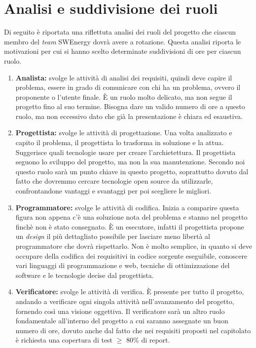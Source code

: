 \section{Analisi e suddivisione dei ruoli}

Di seguito è riportata una riflettuta analisi dei ruoli del progetto che ciascun
membro del \textit{team} SWEnergy dovrà avere a rotazione.
Questa analisi riporta le motivazioni per cui si hanno scelto determinate suddivisioni 
di ore per ciascun ruolo.
\begin{enumerate}

\item \textbf{Analista:} svolge le attività di analisi dei requisiti, quindi deve capire
il problema, essere in grado di comunicare con chi ha un problema, ovvero il proponente 
o l'utente finale. È un ruolo molto delicato, ma non segue il progetto fino al suo termine.
Bisogna dare un valido numero di ore a questo ruolo, ma non eccessivo dato che già la presentazione 
è chiara ed esaustiva.

\item \textbf{Progettista:} svolge le attività di progettazione. 
Una volta analizzato e capito il problema, il progettista lo trasforma
in soluzione e la attua. Suggerisce quali tecnologie usare per creare l'archietettura.
Il progettista seguono lo sviluppo del progetto, ma non la sua manutenzione.
Secondo noi questo ruolo sarà un punto chiave in questo progetto, soprattutto dovuto dal fatto 
che dovremmo cercare tecnologie open source da utilizzarle, confrontandone vantaggi e svantaggi 
per poi scegliere le migliori.

\item \textbf{Programmatore:} svolge le attività di codifica.
Inizia a comparire questa figura non appena c'è una soluzione nota del problema e stanno 
nel progetto finchè non è stato consegnato.
È un esecutore, infatti il progettista propone un \textit{design} il più dettagliato possibile 
per lasciare meno libertà al programmatore che dovrà rispettarlo.
Non è molto semplice, in quanto si deve occupare della codifica dei requisitivi in codice sorgente
eseguibile, conoscere vari linguaggi di programmazione e web, tecniche di ottimizzazione del software 
e le tecnologie decise dal progettista. 


\item \textbf{Verificatore:} svolge le attività di verifica.
È presente per tutto il progetto, andando a verificare ogni singola attività nell'avanzamento del progetto, 
fornendo così una visione oggettiva.
Il verificatore sarà un altro ruolo fondamentale all'interno del progetto a cui saranno assegnate 
un buon numero di ore, dovuto anche dal fatto che nei requisiti proposti nel capitolato è richiesta una 
copertura di test $\geq$ 80\% di report.


\end{enumerate}
